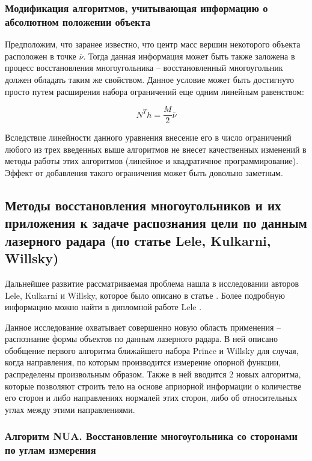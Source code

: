 \documentclass[a4paper, 12pt, titlepage]{article}
\theoremstyle{definition}
\theoremstyle{plain}
\theoremstyle{plain}
\begin{document}
\subsubsection{Модификация алгоритмов, учитывающая информацию о абсолютном
положении объекта}
\label{sec:history/PrinceW90/algo-SHIFT-CORRECT}

Предположим, что заранее известно, что центр масс вершин некоторого объекта
расположен в точке $\overline{\nu}$. Тогда данная информация может быть также
заложена в процесс восстановления многоугольника -- восстановленный
многоугольник должен обладать таким же свойством. Данное условие может быть
достигнуто просто путем расширения набора ограничений еще одним линейным
равенством:

\begin{equation}
N^{T} h = \frac{M}{2} \overline{\nu}
\end{equation}

Вследствие линейности данного уравнения внесение его в число ограничений любого
из трех введенных выше алгоритмов не внесет качественных изменений в методы
работы этих алгоритмов (линейное и квадратичное программирование). Эффект от
добавления такого ограничения может быть довольно заметным.

\newpage
\subsection{Методы восстановления многоугольников и их приложения к
задаче распознания цели по данным лазерного радара (по статье Lele, Kulkarni,
Willsky)}
\label{sec:history/LeleKW92}

Дальнейшее развитие рассматриваемая проблема нашла в исследовании авторов Lele,
Kulkarni и Willsky, которое было описано в статье
\cite{journals/josaa/LeleKW92}. Более подробную информацию можно найти в
дипломной работе Lele \cite{thesis/Lele90}.

Данное исследование охватывает совершенно новую область применения --
распознание формы объектов по данным лазерного радара. В ней описано обобщение
первого алгоритма ближайшего набора Prince и Willsky для случая, когда
направления, по которым производится измерение опорной функции, распределены
произвольным образом. Также в ней вводится 2 новых алгоритма, которые позволяют
строить тело на основе априорной информации о количестве его сторон и
либо направлениях нормалей этих сторон, либо об относительных углах между этими
направлениями.

\subsubsection{Алгоритм NUA. Восстановление многоугольника со сторонами по
углам измерения}
\label{sec:history/LeleKW92/algo-NUA}
\end{document}
